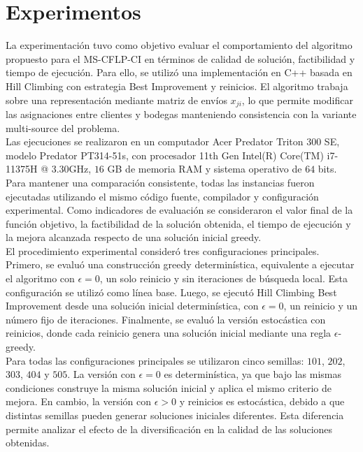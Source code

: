 \section{Experimentos}

\noindent La experimentación tuvo como objetivo evaluar el comportamiento del algoritmo propuesto para el MS-CFLP-CI en términos de calidad de solución, factibilidad y tiempo de ejecución. Para ello, se utilizó una implementación en C++ basada en Hill Climbing con estrategia Best Improvement y reinicios. El algoritmo trabaja sobre una representación mediante matriz de envíos \(x_{ji}\), lo que permite modificar las asignaciones entre clientes y bodegas manteniendo consistencia con la variante multi-source del problema.\\

\noindent Las ejecuciones se realizaron en un computador Acer Predator Triton 300 SE, modelo Predator PT314-51s, con procesador 11th Gen Intel(R) Core(TM) i7-11375H @ 3.30GHz, \(16\) GB de memoria RAM y sistema operativo de \(64\) bits. Para mantener una comparación consistente, todas las instancias fueron ejecutadas utilizando el mismo código fuente, compilador y configuración experimental. Como indicadores de evaluación se consideraron el valor final de la función objetivo, la factibilidad de la solución obtenida, el tiempo de ejecución y la mejora alcanzada respecto de una solución inicial greedy.\\

\noindent El procedimiento experimental consideró tres configuraciones principales. Primero, se evaluó una construcción greedy determinística, equivalente a ejecutar el algoritmo con \(\epsilon = 0\), un solo reinicio y sin iteraciones de búsqueda local. Esta configuración se utilizó como línea base. Luego, se ejecutó Hill Climbing Best Improvement desde una solución inicial determinística, con \(\epsilon = 0\), un reinicio y un número fijo de iteraciones. Finalmente, se evaluó la versión estocástica con reinicios, donde cada reinicio genera una solución inicial mediante una regla \(\epsilon\)-greedy.\\

\noindent Para todas las configuraciones principales se utilizaron cinco semillas: \(101\), \(202\), \(303\), \(404\) y \(505\). La versión con \(\epsilon = 0\) es determinística, ya que bajo las mismas condiciones construye la misma solución inicial y aplica el mismo criterio de mejora. En cambio, la versión con \(\epsilon > 0\) y reinicios es estocástica, debido a que distintas semillas pueden generar soluciones iniciales diferentes. Esta diferencia permite analizar el efecto de la diversificación en la calidad de las soluciones obtenidas.\\

